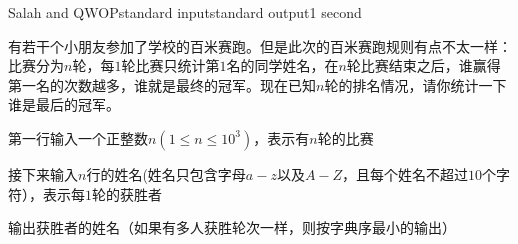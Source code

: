 \begin{problem}{Salah and QWOP}{standard input}{standard output}{1 second}

有若干个小朋友参加了学校的百米赛跑。但是此次的百米赛跑规则有点不太一样：比赛分为$n$轮，每$1$轮比赛只统计第$1$名的同学姓名，在$n$轮比赛结束之后，谁赢得第一名的次数越多，谁就是最终的冠军。现在已知$n$轮的排名情况，请你统计一下谁是最后的冠军。

\InputFile

第一行输入一个正整数$n(1\le n\le 10^3)$，表示有$n$轮的比赛

接下来输入$n$行的姓名(姓名只包含字母$a-z$以及$A-Z$，且每个姓名不超过$10$个字符），表示每$1$轮的获胜者

\OutputFile

输出获胜者的姓名（如果有多人获胜轮次一样，则按字典序最小的输出）

\Examples

\begin{example}
%
%
\end{example}
\end{problem}
